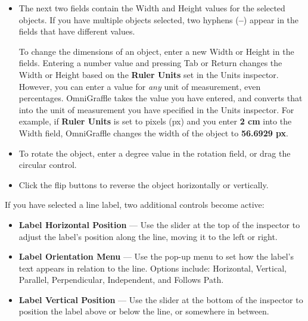\documentclass[../main.tex]{subfiles}
\begin{document}
\begin{itemize}

    If you have multiple objects selected, two hyphens (\textbf{--}) appear in the fields that
    have different values. Enter a new X or Y value to move an object on the canvas.
  \item The next two fields contain the Width and Height values for the selected objects. If you
    have multiple objects selected, two hyphens (\textbf{--}) appear in the fields that have
    different values.

    To change the dimensions of an object, enter a new Width or Height in the fields. Entering a
    number value and pressing Tab or Return changes the Width or Height based on the
    \textbf{Ruler Units} set in the Units inspector. However, you can enter a value for
    \textit{any} unit of measurement, even percentages. OmniGraffle takes the value you have
    entered, and converts that into the unit of measurement you have specified in the Units
    inspector. For example, if \textbf{Ruler Units} is set to pixels (px) and you enter
    \textbf{2 cm} into the Width field, OmniGraffle changes the width of the object to
    \textbf{56.6929 px}.
  \item To rotate the object, enter a degree value in the rotation field, or drag the circular
    control.
  \item Click the flip buttons to reverse the object horizontally or vertically.
\end{itemize}

If you have selected a line label, two additional controls become active:


\begin{itemize}
  \item \textbf{Label Horizontal Position} --- Use the slider at the top of the inspector to
    adjust the label's position along the line, moving it to the left or right.
  \item \textbf{Label Orientation Menu} --- Use the pop-up menu to set how the label's text
    appears in relation to the line. Options include: Horizontal, Vertical, Parallel,
    Perpendicular, Independent, and Follows Path.
  \item \textbf{Label Vertical Position} --- Use the slider at the bottom of the inspector to
    position the label above or below the line, or somewhere in between.
\end{itemize}
\end{document}
